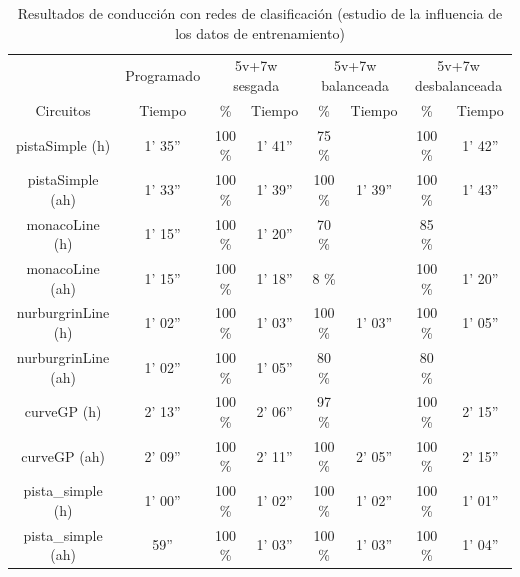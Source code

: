 \begin{table}[H]
\centering
\caption{Resultados de conducción con redes de clasificación (estudio de la influencia de los datos de entrenamiento)}
\label{resultados_classificacion_bases_datos}
\resizebox{16cm}{!} {
\begin{tabular}{c|c|c|c|c|c|c|c|}
\cline{2-8}
                          & \multicolumn{1}{c|}{Programado} & \multicolumn{2}{c|}{5v+7w sesgada} & \multicolumn{2}{c|}{5v+7w balanceada} & \multicolumn{2}{c|}{5v+7w desbalanceada} \\ \cline{1-8} 
                        \multicolumn{1}{|c|}{Circuitos}    & Tiempo       & \%       & Tiempo       & \%        & Tiempo       & \%      & Tiempo     \\ \hline
\multicolumn{1}{|c|}{pistaSimple (h)}    & 1' 35''           & 100 \%         & 1' 41''           & 75 \%          &            & 100 \%       & 1' 42''      \\ \hline
\multicolumn{1}{|c|}{pistaSimple (ah)}     & 1' 33''           & 100 \%          & 1' 39''            & 100 \%           & 1' 39''           & 100 \%       & 1' 43''       \\ \hline
\multicolumn{1}{|c|}{monacoLine (h)}      & 1' 15''           & 100 \%           & 1' 20''            & 70 \%       &             & 85 \%       &           \\ \hline
\multicolumn{1}{|c|}{monacoLine (ah)}       & 1' 15''            & 100 \%       & 1' 18''            & 8 \%           &             & 100 \%          & 1' 20''       \\ \hline
\multicolumn{1}{|c|}{nurburgrinLine (h)}      & 1' 02''            & 100 \%          & 1' 03''            & 100 \%        & 1' 03''            & 100 \%       & 1' 05''      \\ \hline
\multicolumn{1}{|c|}{nurburgrinLine (ah)}       & 1' 02''           & 100 \%           & 1' 05''           & 80 \%        &            & 80 \%       &       \\ \hline
\multicolumn{1}{|c|}{curveGP (h)}     & 2' 13''           & 100 \%           & 2' 06''            & 97 \%        &            & 100 \%       & 2' 15''      \\ \hline
\multicolumn{1}{|c|}{curveGP (ah)}       & 2' 09''            & 100 \%         & 2' 11''            & 100 \%        & 2' 05''           & 100 \%      & 2' 15''     \\ \hline
\multicolumn{1}{|c|}{pista\_simple (h)}       & 1' 00''           & 100 \%          & 1' 02''            & 100 \%        & 1' 02''             & 100 \%      & 1' 01''       \\ \hline
\multicolumn{1}{|c|}{pista\_simple (ah)}     & 59''            & 100 \%          & 1' 03''          & 100 \%        & 1' 03''             & 100 \%      & 1' 04''        \\ \hline
\end{tabular}
}
\end{table}


